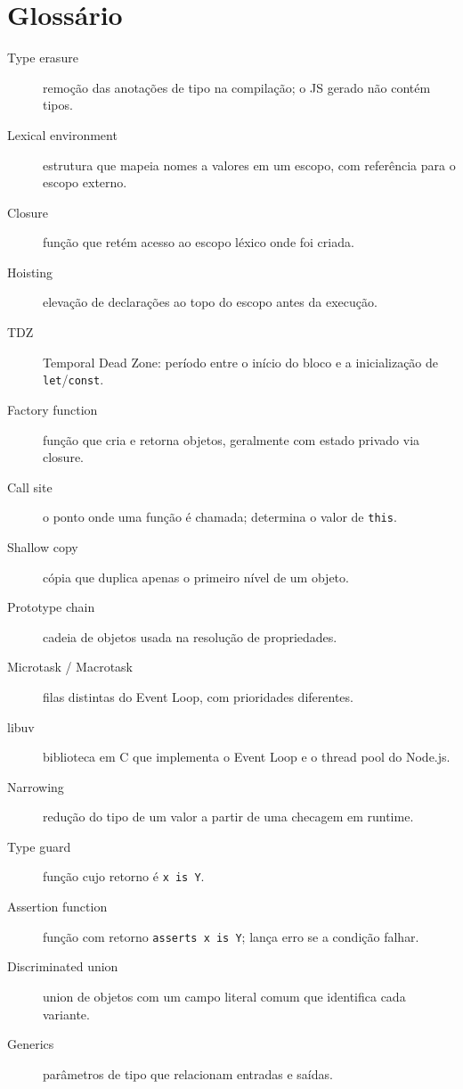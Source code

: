 \documentclass[12pt,a4paper,oneside]{book}
\newcommand{\code}[1]{\texttt{#1}}
\begin{document}
\chapter{Glossário}

\begin{description}
  \item[Type erasure] remoção das anotações de tipo na compilação; o JS gerado não contém tipos.
  \item[Lexical environment] estrutura que mapeia nomes a valores em um escopo, com referência para o escopo externo.
  \item[Closure] função que retém acesso ao escopo léxico onde foi criada.
  \item[Hoisting] elevação de declarações ao topo do escopo antes da execução.
  \item[TDZ] Temporal Dead Zone: período entre o início do bloco e a inicialização de \code{let}/\code{const}.
  \item[Factory function] função que cria e retorna objetos, geralmente com estado privado via closure.
  \item[Call site] o ponto onde uma função é chamada; determina o valor de \code{this}.
  \item[Shallow copy] cópia que duplica apenas o primeiro nível de um objeto.
  \item[Prototype chain] cadeia de objetos usada na resolução de propriedades.
  \item[Microtask / Macrotask] filas distintas do Event Loop, com prioridades diferentes.
  \item[libuv] biblioteca em C que implementa o Event Loop e o thread pool do Node.js.
  \item[Narrowing] redução do tipo de um valor a partir de uma checagem em runtime.
  \item[Type guard] função cujo retorno é \code{x is Y}.
  \item[Assertion function] função com retorno \code{asserts x is Y}; lança erro se a condição falhar.
  \item[Discriminated union] union de objetos com um campo literal comum que identifica cada variante.
  \item[Generics] parâmetros de tipo que relacionam entradas e saídas.

\end{description}
\end{document}
